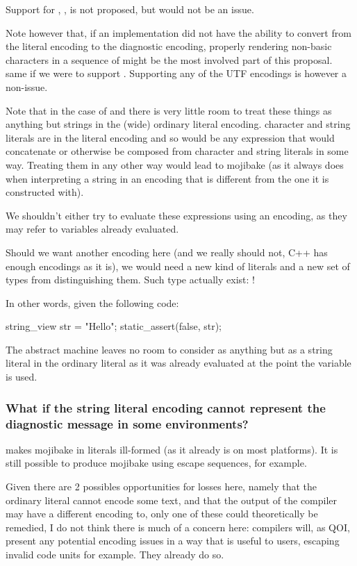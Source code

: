 \documentclass{wg21}
\begin{document}
Support for , ,  is not proposed, but would not be an issue.

Note however that, if an implementation did not have the ability to convert from the literal encoding to the diagnostic encoding,
properly rendering non-basic characters in a sequence of  might be the most involved part of this proposal. same if we were to support .
Supporting any of the UTF encodings is however a non-issue.

Note that in the case of  and  there is very little room to treat these things as anything but strings in the (wide) ordinary literal encoding.
character and string literals are in the literal encoding and so would be any expression that would concatenate or otherwise be composed from
character and string literals in some way.
Treating them in any other way would lead to mojibake (as it always does when interpreting a string in an encoding that is different from the one it is constructed with).

We shouldn't either try to evaluate these expressions using an encoding, as they may refer to variables already evaluated.

Should we want another encoding here (and we really should not, C++ has enough encodings as it is), we would need a new kind of literals and a new set of types from distinguishing them. Such type actually exist: !

In other words, given the following code:

\begin{colorblock}
string_view str = "Hello";
static_assert(false, str);
\end{colorblock}

The abstract machine leaves no room to consider  as anything but as a string literal in the ordinary literal as
it was already evaluated at the point the variable is used.

\subsubsection{What if the string literal encoding cannot represent the diagnostic message in some environments?}

 makes mojibake in literals ill-formed (as it already is on most platforms). It is still possible to produce mojibake using
escape sequences, for example.

Given there are 2 possibles opportunities for losses here, namely that the ordinary literal cannot encode some text, and that the
output of the compiler may have a different encoding to, only one of these could theoretically be remedied, I do not think there is much of a concern here: compilers will, as QOI, present any potential encoding issues in a way that is useful to users, escaping invalid code units for example.
They already do so.
\end{document}

